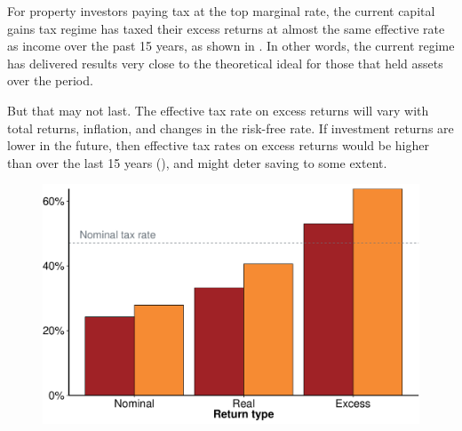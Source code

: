 \documentclass{grattanAlpha}\usepackage[]{graphicx}\usepackage[]{color}
\begin{document}
For property investors paying tax at the top marginal rate, the current capital gains tax regime has taxed their excess returns at almost the same effective rate as income over the past 15 years, as shown in . In other words, the current regime has delivered results very close to the theoretical ideal for those that held assets over the period. 

But that may not last. The effective tax rate on excess returns will vary with total returns, inflation, and changes in the risk-free rate. If investment returns are lower in the future, then effective tax rates on excess returns would be higher than over the last 15 years (), and might deter saving to some extent. 
\begin{figure}[!tp]
\label{fig:EMTR-savings}
\includegraphics[width=\columnwidth]{CGT-NG-atlas//EMTR-nominal-real-excess-historic-vs-lower-1}

\end{figure}
\end{document}
